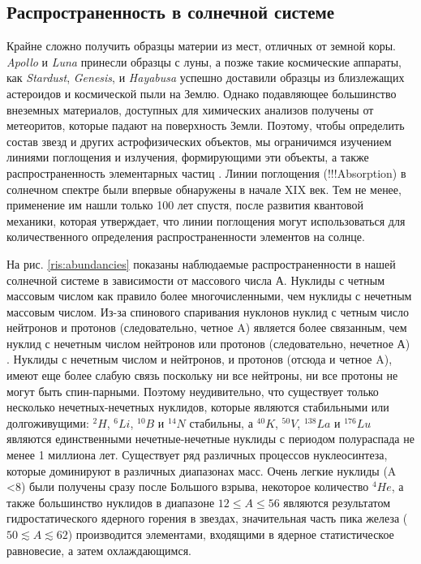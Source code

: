 \documentclass[%
master,    %
natbib,      %
subf,        %
href,        %
colorlinks,  %
]{disser}
\begin{document}
\subsection{Распространенность в солнечной системе}
Крайне сложно получить образцы материи из мест, отличных от земной коры. \textit{Apollo} и \textit{Luna} принесли образцы с луны, а позже такие космические аппараты, как \textit{Stardust}, \textit{Genesis}, и \textit{Hayabusa} успешно доставили образцы из близлежащих астероидов и космической пыли на Землю. Однако подавляющее большинство внеземных материалов, доступных для химических анализов получены от метеоритов, которые падают на поверхность Земли. Поэтому, чтобы определить состав звезд и других астрофизических	 объектов, мы ограничимся изучением линиями поглощения и излучения, формирующими эти объекты, а также распространенность элементарных частиц \cite{shaviv}. Линии поглощения (!!!Absorption) в солнечном спектре были впервые обнаружены в начале XIX век. Тем не менее, применение им нашли только 100 лет спустя, после развития квантовой механики, которая утверждает, что линии поглощения могут использоваться для количественного определения распространенности элементов на солнце.

На рис. \ref{ris:abundancies} показаны наблюдаемые распространенности в нашей солнечной системе в зависимости от массового числа А. Нуклиды с четным массовым числом как правило более многочисленными, чем нуклиды с нечетным массовым числом. Из-за спинового спаривания нуклонов нуклид с четным число нейтронов и протонов (следовательно, четное A) является более связанным, чем нуклид с нечетным числом нейтронов или протонов (следовательно, нечетное А) \cite{zur}. Нуклиды с нечетным числом и нейтронов, и протонов (отсюда и четное A), имеют еще более слабую связь поскольку ни все нейтроны, ни все протоны не могут быть спин-парными. Поэтому неудивительно, что существует только несколько нечетных-нечетных нуклидов, которые являются стабильными или долгоживущими: $^2H$, $^6Li$, $^{10}B$ и $^{14}N$ стабильны, а $^{40}K$, $^{50}V$, $^{138}La$ и $^{176}Lu$ являются единственными нечетные-нечетные нуклиды с периодом полураспада не менее 1 миллиона лет. Существует ряд различных процессов нуклеосинтеза, которые доминируют в различных диапазонах масс. Очень легкие нуклиды (A <8) были получены сразу после Большого взрыва, некоторое количество $^4He$, а также большинство нуклидов в диапазоне $12 \le A \le 56$ являются результатом гидростатического ядерного горения в звездах, значительная часть пика железа ($50 \lesssim A \lesssim 62$) производится элементами, входящими в ядерное статистическое равновесие, а затем охлаждающимся.
\end{document}

